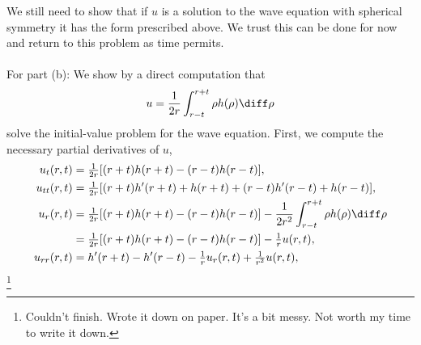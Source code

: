 \begin{solution}
  We still need to show that if \(u\) is a solution to the wave equation
  with spherical symmetry it has the form prescribed above. We trust this
  can be done for now and return to this problem as time permits.
  \\\\
  For part (b): We show by a direct computation that
  \[
    u=\frac{1}{2r}\int_{r-t}^{r+t}\rho h(\rho)\diff\rho
  \]
  solve the initial-value problem for the wave equation. First, we compute
  the necessary partial derivatives of \(u\),
  \begin{align*}
    u_t(r,t)
    &=\tfrac{1}{2r}[(r+t)h(r+t)-(r-t)h(r-t)],\\
    u_{tt}(r,t)
    &=\tfrac{1}{2r}[(r+t)h'(r+t)+h(r+t)+(r-t)h'(r-t)+h(r-t)],\\
    u_r(r,t)
    &=\tfrac{1}{2r}[(r+t)h(r+t)-(r-t)h(r-t)]
      -\frac{1}{2r^2}\int_{r-t}^{r+t}\rho h(\rho)\diff\rho\\
    &=\tfrac{1}{2r}[(r+t)h(r+t)-(r-t)h(r-t)]
      -\tfrac{1}{r}u(r,t),\\
    u_{rr}(r,t)&=h'(r+t)-h'(r-t)-\tfrac{1}{r}u_r(r,t)+\tfrac{1}{r^2}u(r,t),
  \end{align*}
  \footnote{Couldn't finish. Wrote it down on paper. It's a bit messy. Not
    worth my time to write it down.}
\end{solution}
\newpage


